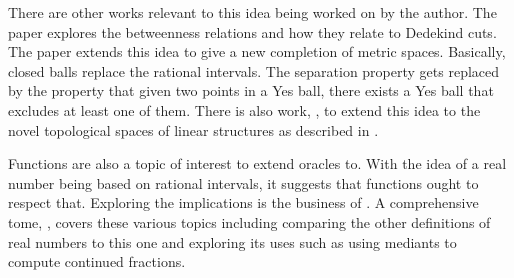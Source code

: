 \documentclass[12pt]{article}
\begin{document}
There are other works relevant to this idea being worked on by the author. The paper \cite{taylor24dedekind} explores the betweenness relations and how they relate to Dedekind cuts. The paper \cite{taylor23metric} extends this idea to give a new completion of metric spaces. Basically, closed balls replace the rational intervals. The separation property gets replaced by the property that given two points in a Yes ball, there exists a Yes ball that excludes at least one of them. There is also work, \cite{taylor23maudlin}, to extend this idea to the novel topological spaces of linear structures as described in \cite{maudlin}. 

Functions are also a topic of interest to extend oracles to. With the idea of a real number being based on rational intervals, it suggests that functions ought to respect that. Exploring the implications is the business of \cite{taylor23funora}. A comprehensive tome, \cite{taylor23main}, covers these various topics including comparing the other definitions of real numbers to this one and exploring its uses such as using mediants to compute continued fractions. 

\medskip

\normalem %

\printbibliography
\end{document}
